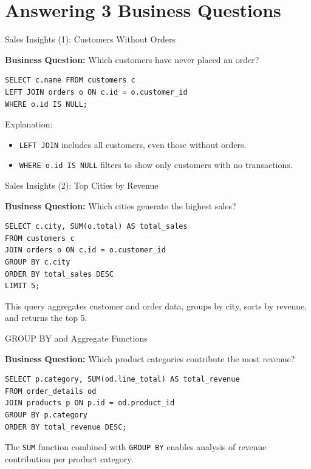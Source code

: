 \documentclass[aspectratio=169, table]{beamer}
\begin{document}
\section{Answering 3 Business Questions}
\begin{frame}[fragile]{Sales Insights (1): Customers Without Orders}
\vspace{20pt}

\textbf{Business Question:} Which customers have never placed an order?

\begin{lstlisting}[style=SqlStyle]
SELECT c.name FROM customers c
LEFT JOIN orders o ON c.id = o.customer_id
WHERE o.id IS NULL;
\end{lstlisting}

Explanation:
\begin{itemize}
\item \texttt{LEFT JOIN} includes all customers, even those without orders.
\item \texttt{WHERE o.id IS NULL} filters to show only customers with no transactions.
\end{itemize}
\end{frame}

\begin{frame}[fragile]{Sales Insights (2): Top Cities by Revenue}
\vspace{20pt}

\textbf{Business Question:} Which cities generate the highest sales?

\begin{lstlisting}[style=SqlStyle]
SELECT c.city, SUM(o.total) AS total_sales
FROM customers c
JOIN orders o ON c.id = o.customer_id
GROUP BY c.city
ORDER BY total_sales DESC
LIMIT 5;
\end{lstlisting}

This query aggregates customer and order data, groups by city, sorts by revenue, and returns the top 5.

\end{frame}

\begin{frame}[fragile]{GROUP BY and Aggregate Functions}
\vspace{20pt}

\textbf{Business Question:} Which product categories contribute the most revenue?

\begin{lstlisting}[style=SqlStyle]
SELECT p.category, SUM(od.line_total) AS total_revenue
FROM order_details od
JOIN products p ON p.id = od.product_id
GROUP BY p.category
ORDER BY total_revenue DESC;
\end{lstlisting}

The \texttt{SUM} function combined with \texttt{GROUP BY} enables analysis of revenue contribution per product category.

\end{frame}
\end{document}
